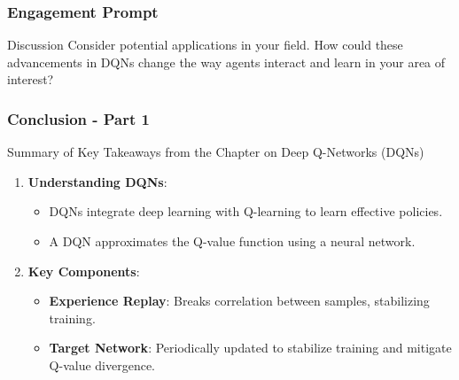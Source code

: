 \documentclass[aspectratio=169]{beamer}
\begin{document}
\begin{frame}[fragile]
    \frametitle{Engagement Prompt}
    \begin{block}{Discussion}
        Consider potential applications in your field. How could these advancements in DQNs change the way agents interact and learn in your area of interest?
    \end{block}
\end{frame}

\begin{frame}[fragile]
    \frametitle{Conclusion - Part 1}
    \begin{block}{Summary of Key Takeaways from the Chapter on Deep Q-Networks (DQNs)}
        \begin{enumerate}
            \item \textbf{Understanding DQNs}:
                \begin{itemize}
                    \item DQNs integrate deep learning with Q-learning to learn effective policies.
                    \item A DQN approximates the Q-value function using a neural network.
                \end{itemize}
            \item \textbf{Key Components}:
                \begin{itemize}
                    \item \textbf{Experience Replay}: Breaks correlation between samples, stabilizing training.
                    \item \textbf{Target Network}: Periodically updated to stabilize training and mitigate Q-value divergence.
                \end{itemize}
        \end{enumerate}
    \end{block}
\end{frame}
\end{document}
